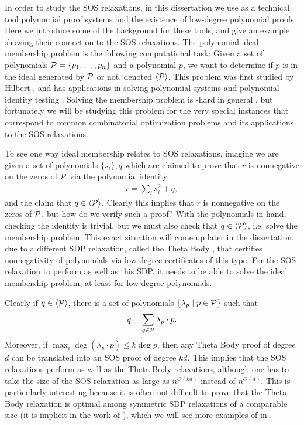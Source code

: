In order to study the SOS relaxations, in this dissertation we use as a technical tool polynomial proof systems and the existence of low-degree polynomial proofs.
Here we introduce some of the background for these tools, and give an example showing their connection to the SOS relaxations.
The polynomial ideal membership problem is the following computational task:
Given a set of polynomials $\mathcal P = \{p_1,\dots,p_n\}$ and a polynomial $p$, we want to determine if $p$ is in the ideal generated by $\mathcal P$ or not, denoted $\langle \mathcal P \rangle$.
This problem was first studied by Hilbert \cite{Hilbert1893}, and has applications in solving polynomial systems \cite{CLO07} and polynomial identity testing \cite{AM10}.
Solving the membership problem is \expspace-hard in general \cite{MM82,Huynh1985}, but fortunately we will be studying this problem for the very special instances that correspond to common combinatorial optimization problems and its applications to the SOS relaxations.

To see one way ideal membership relates to SOS relaxations, imagine we are given a set of polynomials $\{s_i\}, q$ which are claimed to prove that $r$ is nonnegative on the zeros of $\mathcal P$ via the polynomial identity
\begin{align}
r = \sum_i s_i^2 + q,
\end{align}
and the claim that $q \in \langle \mathcal P \rangle$. Clearly this implies that $r$ is nonnegative on the zeros of $\mathcal P$, but how do we verify such a proof? With the polynomials in hand, checking the identity is trivial, but we must also check that $q \in \langle \mathcal P \rangle$, i.e. solve the membership problem.
This exact situation will come up later in the dissertation, due to a different SDP relaxation, called the Theta Body \cite{GPT10}, that certifies nonnegativity of polynomials via low-degree certificates of this type.
For the SOS relaxation to perform as well as this SDP, it needs to be able to solve the ideal membership problem, at least for low-degree polynomials.

Clearly if $q \in \langle \mathcal P \rangle$, there is a set of polynomials $\{\lambda_p \mid p \in \mathcal P\}$ such that
\[q = \sum_{q \in \mathcal P} \lambda_p \cdot p.\]
Moreover, if $\max_i \deg(\lambda_p \cdot p) \leq k\deg p$, then any Theta Body proof of degree $d$ can be translated into an SOS proof of degree $kd$.
This implies that the SOS relaxations perform as well as the Theta Body relaxations, although one has to take the size of the SOS relaxation as large as $n^{O(kd)}$ instead of $n^{O(d)}$.
This is particularly interesting because it is often not difficult to prove that the Theta Body relaxation is optimal among symmetric SDP relaxations of a comparable size (it is implicit in the work of \cite{LRST14}), which we will see more examples of in . 

